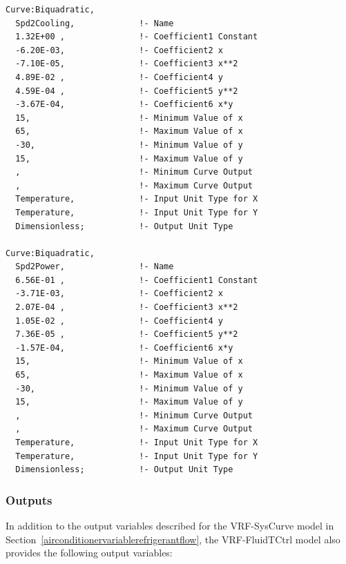\begin{lstlisting}
Curve:Biquadratic,
  Spd2Cooling,             !- Name
  1.32E+00 ,               !- Coefficient1 Constant
  -6.20E-03,               !- Coefficient2 x
  -7.10E-05,               !- Coefficient3 x**2
  4.89E-02 ,               !- Coefficient4 y
  4.59E-04 ,               !- Coefficient5 y**2
  -3.67E-04,               !- Coefficient6 x*y
  15,                      !- Minimum Value of x
  65,                      !- Maximum Value of x
  -30,                     !- Minimum Value of y
  15,                      !- Maximum Value of y
  ,                        !- Minimum Curve Output
  ,                        !- Maximum Curve Output
  Temperature,             !- Input Unit Type for X
  Temperature,             !- Input Unit Type for Y
  Dimensionless;           !- Output Unit Type

Curve:Biquadratic,
  Spd2Power,               !- Name
  6.56E-01 ,               !- Coefficient1 Constant
  -3.71E-03,               !- Coefficient2 x
  2.07E-04 ,               !- Coefficient3 x**2
  1.05E-02 ,               !- Coefficient4 y
  7.36E-05 ,               !- Coefficient5 y**2
  -1.57E-04,               !- Coefficient6 x*y
  15,                      !- Minimum Value of x
  65,                      !- Maximum Value of x
  -30,                     !- Minimum Value of y
  15,                      !- Maximum Value of y
  ,                        !- Minimum Curve Output
  ,                        !- Maximum Curve Output
  Temperature,             !- Input Unit Type for X
  Temperature,             !- Input Unit Type for Y
  Dimensionless;           !- Output Unit Type
\end{lstlisting}

\subsubsection{Outputs}

In addition to the output variables described for the VRF-SysCurve model in Section~\ref{airconditionervariablerefrigerantflow}, the VRF-FluidTCtrl model also provides the following output variables:


